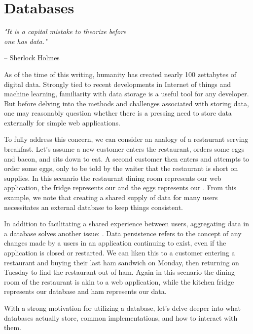 \setchapterpreamble[u]{\margintoc}
\chapter{Databases}
\epigraph{\emph{"It is a capital mistake to theorize before  \\ one has data."}}{ -- Sherlock Holmes}

As of the time of this writing, humanity has created nearly 100 zettabytes of digital data. Strongly tied to recent developments in Internet of things and machine learning, familiarity with data storage is a useful tool for any developer. But before delving into the methods and challenges associated with storing data, one may reasonably question whether there is a pressing need to store data externally for simple web applications. 

To fully address this concern, we can consider an analogy of a restaurant serving breakfast. Let's assume a new customer enters the restaurant, orders some eggs and bacon, and sits down to eat. A second customer then enters and attempts to order some eggs, only to be told by the waiter that the restaurant is short on supplies. In this scenario the restaurant dining room represents our web application, the fridge represents our  and the eggs represents our . From this example, we note that creating a shared supply of data for many users necessitates an external database to keep things consistent. 


In addition to facilitating a shared experience between users, aggregating data in a database solves another issue: . Data persistence refers to the concept of any changes made by a users in an application continuing to exist, even if the application is closed or restarted. We can liken this to a customer entering a restaurant and buying their last ham sandwich on Monday, then returning on Tuesday to find the restaurant out of ham. Again in this scenario the dining room of the restaurant is akin to a web application, while the kitchen fridge represents our database and ham represents our data. 

With a strong motivation for utilizing a database, let's delve deeper into what databases actually store, common implementations, and how to interact with them.


